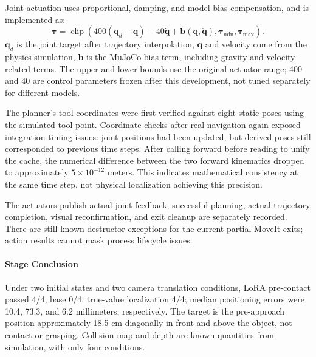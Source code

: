 Joint actuation uses proportional, damping, and model bias compensation, and is implemented as: \[\boldsymbol\tau=\operatorname{clip}\left(400(\boldsymbol q_d-\boldsymbol q)-40\dot{\boldsymbol q}+\boldsymbol b(\boldsymbol q,\dot{\boldsymbol q}),\boldsymbol\tau_{\min},\boldsymbol\tau_{\max}\right).\] \(\boldsymbol q_d\) is the joint target after trajectory interpolation, \(\boldsymbol q\) and velocity come from the physics simulation, \(\boldsymbol b\) is the MuJoCo bias term, including gravity and velocity-related terms. The upper and lower bounds use the original actuator range; 400 and 40 are control parameters frozen after this development, not tuned separately for different models.

The planner's tool coordinates were first verified against eight static poses using the simulated tool point. Coordinate checks after real navigation again exposed integration timing issues: joint positions had been updated, but derived poses still corresponded to previous time steps. After calling forward before reading to unify the cache, the numerical difference between the two forward kinematics dropped to approximately \(5\times10^{-12}\) meters. This indicates mathematical consistency at the same time step, not physical localization achieving this precision.

The actuators publish actual joint feedback; successful planning, actual trajectory completion, visual reconfirmation, and exit cleanup are separately recorded. There are still known destructor exceptions for the current partial MoveIt exits; action results cannot mask process lifecycle issues.


\paragraph{Stage Conclusion} Under two initial states and two camera translation conditions, LoRA pre-contact passed 4/4, base 0/4, true-value localization 4/4; median positioning errors were 10.4, 73.3, and 6.2 millimeters, respectively. The target is the pre-approach position approximately 18.5 cm diagonally in front and above the object, not contact or grasping. Collision map and depth are known quantities from simulation, with only four conditions.



